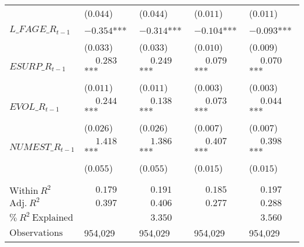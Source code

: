 \begin{table}
\begin{tabular}[t]{>{\raggedright\arraybackslash}p{5.1cm}>{\raggedright\arraybackslash}p{2.1cm}>{\raggedright\arraybackslash}p{2.1cm}>{\raggedright\arraybackslash}p{2.1cm}>{\raggedright\arraybackslash}p{2.1cm}}
 & (\phantom{-}$0.044$) & (\phantom{-}$0.044$) & (\phantom{-}$0.011$) & (\phantom{-}$0.011$)\\
\addlinespace
$L\_FAGE\_R_{t-1}$ & $-0.354$*** & $-0.314$*** & $-0.104$*** & $-0.093$***\\
 & (\phantom{-}$0.033$) & (\phantom{-}$0.033$) & (\phantom{-}$0.010$) & (\phantom{-}$0.009$)\\
\addlinespace
$ESURP\_R_{t-1}$ & $\phantom{-}0.283$*** & $\phantom{-}0.249$*** & $\phantom{-}0.079$*** & $\phantom{-}0.070$***\\
 & (\phantom{-}$0.011$) & (\phantom{-}$0.011$) & (\phantom{-}$0.003$) & (\phantom{-}$0.003$)\\
\addlinespace
$EVOL\_R_{t-1}$ & $\phantom{-}0.244$*** & $\phantom{-}0.138$*** & $\phantom{-}0.073$*** & $\phantom{-}0.044$***\\
 & (\phantom{-}$0.026$) & (\phantom{-}$0.026$) & (\phantom{-}$0.007$) & (\phantom{-}$0.007$)\\
\addlinespace
$NUMEST\_R_{t-1}$ & $\phantom{-}1.418$*** & $\phantom{-}1.386$*** & $\phantom{-}0.407$*** & $\phantom{-}0.398$***\\
 & (\phantom{-}$0.055$) & (\phantom{-}$0.055$) & (\phantom{-}$0.015$) & (\phantom{-}$0.015$)\\
 &  &  &  \vphantom{1} & \\
\midrule
 &  &  &  & \\
$\textrm{Within} \: R^2$ & {$\phantom{-}0.179$} & {$\phantom{-}0.191$} & {$\phantom{-}0.185$} & {$\phantom{-}0.197$}\\
$\textrm{Adj.} \: R^2$ & {$\phantom{-}0.397$} & {$\phantom{-}0.406$} & {$\phantom{-}0.277$} & {$\phantom{-}0.288$}\\
$\% \: R^2 \: \textrm{Explained}$ & {} & {$\phantom{-}3.350$} & {} & {$\phantom{-}3.560$}\\
$\textrm{Observations}$ & {\phantom{-}954,029} & {\phantom{-}954,029} & {\phantom{-}954,029} & {\phantom{-}954,029}\\
\bottomrule
\end{tabular}
\end{table}